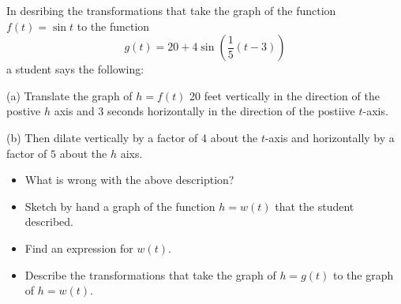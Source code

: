 \documentclass{ximera}
\begin{document}
\begin{question} \label{Exsdfdsf:Graphs}
In desribing the transformations that take the graph of the function $f(t) = \sin t$ to the function
\[
  g(t) = 20 + 4 \sin \left( \frac{1}{5}(t-3) \right) 
\]
a student says the following:

(a) Translate the graph of $h=f(t)$ 20 feet vertically in the direction of the postive $h$ axis and $3$ seconds horizontally in the direction of the postiive $t$-axis.

(b) Then dilate vertically by a factor of 4 about the $t$-axis and horizontally by a factor of $5$ about the $h$ aixs.


\begin{itemize}
\item{What is wrong with the above description?}

\item{Sketch by hand a graph of the function $h=w(t)$ that the student described.}

\item{Find an expression for $w(t)$.}

\item{Describe the transformations that take the graph of $h=g(t)$ to the graph of $h=w(t)$.}

\end{itemize}

\end{question}
\end{document}
